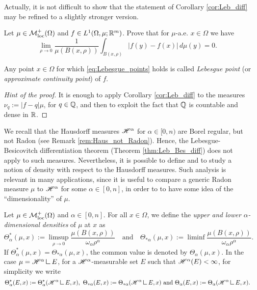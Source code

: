 Actually, it is not difficult to show that the statement of Corollary \ref{cor:Leb_diff} may be refined to a slightly stronger version.

\begin{corollary}
Let $\mu \in \mathcal{M}^{+}_{\rm loc}(\Omega)$ and $f \in L^{1}(\Omega, \mu; \mathbb{R}^{m})$. Prove that for $\mu$-a.e. $x \in \Omega$ we have
\begin{equation} \label{eq:Lebesgue_points}
\lim_{\rho \to 0} \frac{1}{\mu(B(x, \rho))} \int_{B(x, \rho)}|f(y) - f(x)| \, d \mu(y) = 0.
\end{equation}
\end{corollary}
Any point $x \in \Omega$ for which \eqref{eq:Lebesgue_points} holds is called {\em Lebesgue point} (or {\em approximate continuity point}) of $f$.

\begin{proof}[Hint of the proof]
It is enough to apply Corollary \ref{cor:Leb_diff} to the measures $\nu_{q} := |f - q| \mu$, for $q \in \mathbb{Q}$, and then to exploit the fact that $\mathbb{Q}$ is countable and dense in $\mathbb{R}$.
\end{proof}

We recall that the Hausdorff measures $\mathscr{H}^{\alpha}$ for $\alpha \in [0, n)$ are Borel regular, but not Radon (see Remark \ref{rem:Haus_not_Radon}). Hence, the Lebesgue-Besicovitch differentiation theorem (Theorem \ref{thm:Leb_Bes_diff}) does not apply to such measures. Nevertheless, it is possible to define and to study a notion of density with respect to the Hausdorff measures. Such analysis is relevant in many applications, since it is useful to compare a generic Radon measure $\mu$ to $\mathscr{H}^{\alpha}$ for some $\alpha \in [0, n]$, in order to to have some idea of the ``dimensionality'' of $\mu$.

\begin{definition}
Let $\mu \in \mathcal{M}^{+}_{\rm loc}(\Omega)$ and $\alpha \in [0, n]$. For all $x \in \Omega$, we define the {\em upper and lower $\alpha$-dimensional densities} of $\mu$ at $x$ as
\begin{equation*}
\Theta^{*}_{\alpha}(\mu, x) := \limsup_{\rho \to 0} \frac{\mu(B(x, \rho))}{\omega_{\alpha} \rho^{\alpha}} \quad \text{and} \quad \Theta_{* \alpha}(\mu, x) := \liminf \frac{\mu(B(x, \rho))}{\omega_{\alpha} \rho^{\alpha}}.
\end{equation*}
If $\Theta^{*}_{\alpha}(\mu, x) = \Theta_{* \alpha}(\mu, x)$, the common value is denoted by $\Theta_{\alpha}(\mu, x)$.
In the case $\mu = \Haus{\alpha} \res E$, for a $\mathscr{H}^{\alpha}$-measurable set $E$ such that $\mathscr{H}^{\alpha}(E) < \infty$, for simplicity we write
\begin{equation*}
\Theta^{*}_{\alpha}(E, x) := \Theta^{*}_{\alpha}(\Haus{\alpha} \res E, x), \ \Theta_{* \alpha}(E, x) := \Theta_{* \alpha}(\Haus{\alpha} \res E, x) \text{ and }  \Theta_{\alpha}(E, x) := \Theta_{\alpha}(\Haus{\alpha} \res E, x).
\end{equation*}
\end{definition}

